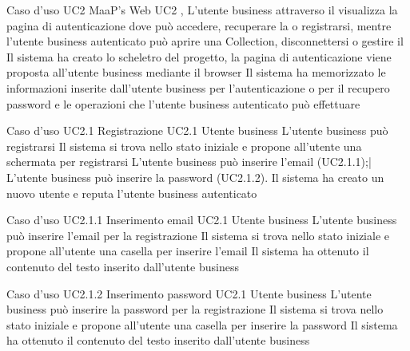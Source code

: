 
\UCtitle
{Caso d'uso UC2}
{MaaP's Web}
\UC
{UC2}
{, }
{L'utente business attraverso il  visualizza la pagina di autenticazione dove può accedere, recuperare la  o registrarsi, mentre l'utente business autenticato può aprire una Collection, disconnettersi o gestire il }
{Il sistema ha creato lo scheletro del progetto, la pagina di autenticazione viene proposta all'utente business mediante il browser}
\post
{Il sistema ha memorizzato le informazioni inserite dall'utente business per l'autenticazione o per il recupero password e le operazioni che l'utente business autenticato può effettuare}



\UCtitle
{Caso d'uso UC2.1}
{Registrazione}
\UC
{UC2.1}
{Utente business}
{L'utente business può registrarsi}
{Il sistema si trova nello stato iniziale e propone all'utente una schermata per registrarsi}
\scenario
{
L'utente business può inserire l'email (UC2.1.1);|
L'utente business può inserire la password (UC2.1.2).
}
\post
{Il sistema ha creato un nuovo utente e reputa l'utente business autenticato}

\UCtitle
{Caso d'uso UC2.1.1}
{Inserimento email}
\UC
{UC2.1}
{Utente business}
{L'utente business può inserire l'email per la registrazione}
{Il sistema si trova nello stato iniziale e propone all'utente una casella per inserire l'email}
\post
{Il sistema ha ottenuto il contenuto del testo inserito dall'utente business}

\UCtitle
{Caso d'uso UC2.1.2}
{Inserimento password}
\UC
{UC2.1}
{Utente business}
{L'utente business può inserire la password per la registrazione}
{Il sistema si trova nello stato iniziale e propone all'utente una casella per inserire la password}
\post
{Il sistema ha ottenuto il contenuto del testo inserito dall'utente business}

